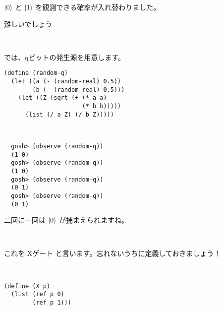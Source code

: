 {$| 0 \rangle$ と $| 1 \rangle$ を観測できる確率が入れ替わりました。}

{難しいでしょう}


\hline
\begin{minipage}{.01\hsize}
  ~
\end{minipage}
\begin{minipage}{.39\hsize}
  では、qビットの発生源を用意します。
  \begin{verbatim}
(define (random-q)
  (let ((a (- (random-real) 0.5))
        (b (- (random-real) 0.5)))
    (let ((Z (sqrt (+ (* a a)
                      (* b b)))))
      (list (/ a Z) (/ b Z)))))
  \end{verbatim}
\end{minipage}
\begin{minipage}{.10\hsize}
  ~
\end{minipage}
\begin{minipage}{.39\hsize}
  \begin{verbatim}
  gosh> (observe (random-q))
  (1 0)
  gosh> (observe (random-q))
  (1 0)
  gosh> (observe (random-q))
  (0 1)
  gosh> (observe (random-q))
  (0 1)
  \end{verbatim}
  二回に一回は $| 0 \rangle$ が捕まえられますね。
\end{minipage}




\hline
\begin{minipage}{.01\hsize}
  ~
\end{minipage}
\begin{minipage}{.39\hsize}
  これを Xゲート
  と言います。忘れないうちに定義しておきましょう！
\end{minipage}
\begin{minipage}{.10\hsize}
  ~
\end{minipage}
\begin{minipage}{.39\hsize}
  \begin{verbatim}
(define (X p)
  (list (ref p 0)
        (ref p 1)))
  \end{verbatim}
\end{minipage}

